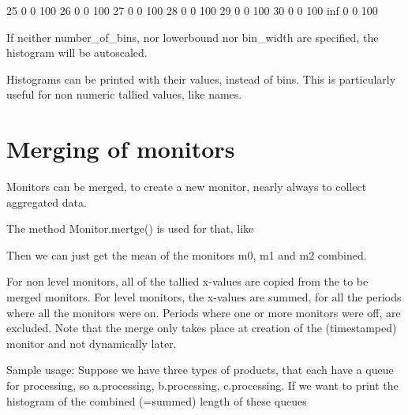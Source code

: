 \documentclass[letterpaper,10pt,english]{sphinxmanual}
\begin{document}
\begin{sphinxVerbatim}[commandchars=\\\{\}]
       25             0       0   100                                                                                   \textbar{}
       26             0       0   100                                                                                   \textbar{}
       27             0       0   100                                                                                   \textbar{}
       28             0       0   100                                                                                   \textbar{}
       29             0       0   100                                                                                   \textbar{}
       30             0       0   100                                                                                   \textbar{}
          inf         0       0   100
\end{sphinxVerbatim}

If neither number\_of\_bins, nor lowerbound nor bin\_width are specified, the histogram will be autoscaled.

Histograms can be printed with their values, instead of bins. This is particularly useful for non
numeric tallied values, like names.


\section{Merging of monitors}
\label{\detokenize{Monitor:merging-of-monitors}}
Monitors can be merged, to create a new monitor, nearly always to collect aggregated data.

The method Monitor.mertge() is used for that, like

\begin{sphinxVerbatim}[commandchars=\\\{\}]
   
\end{sphinxVerbatim}

Then we can just get the mean of the monitors m0, m1 and m2 combined.

For non level monitors, all of the tallied x-values are copied from the to be merged monitors.
For level monitors, the x-values are summed, for all the periods where all the monitors were on.
Periods where one or more monitors were off, are excluded.
Note that the merge only takes place at creation of the (timestamped) monitor and not dynamically later.

Sample usage:
Suppose we have three types of products, that each have a queue for processing, so
a.processing, b.processing, c.processing.
If we want to print the histogram of the combined (=summed) length of these queues
\end{document}
